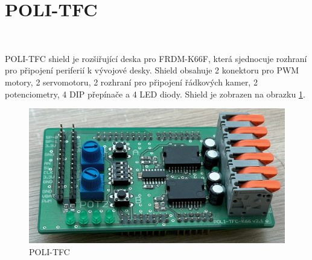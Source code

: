 \section{POLI-TFC}
\label{sec:POLI-TFC}\

POLI-TFC shield je rozšiřující deska pro FRDM-K66F, která sjednocuje rozhraní pro
připojení periferií k vývojové desky. Shield obsahuje 2 konektoru pro PWM motory, 2 servomotoru,
2 rozhraní pro připojení řádkových kamer, 2 potenciometry, 4 DIP přepínače a 4 LED diody.
Shield je zobrazen na obrazku \ref{fig:POLI-TFC}.
\begin{figure}[h]
    \centering
    \includegraphics[width = .5\linewidth]{Figures/POLI-TFC.png}
    \caption{POLI-TFC}
    \label{fig:POLI-TFC}
\end{figure}
